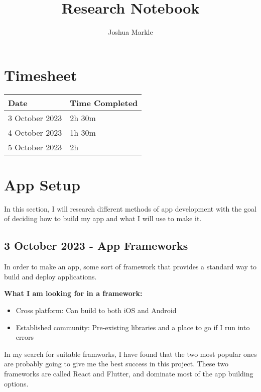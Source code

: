 \documentclass{article}
\title{Research Notebook}
\author{Joshua Markle}
\date{}
\begin{document}
\maketitle

\tableofcontents
\newpage

\section{Timesheet}

\begin{tabular}{|p{3cm}|p{3cm}|}
	\hline
	\textbf{Date} & \textbf{Time Completed} \\ \hline
	3 October 2023 & 2h 30m \\ \hline
	4 October 2023 & 1h 30m \\ \hline
	5 October 2023 & 2h \\ \hline
\end{tabular}
\newpage



\section{App Setup}

In this section, I will research different methods of app development with the goal of deciding how to build my app and what I will use to make it.

\subsection{3 October 2023 - App Frameworks}

In order to make an app, some sort of framework that provides a standard way to build and deploy applications.

\textbf{What I am looking for in a framework:}

\begin{itemize}
				\item Cross platform: Can build to both iOS and Android
				\item Established community: Pre-existing libraries and a place to go if I run into errors
\end{itemize}

In my search for suitable framworks, I have found that the two most popular ones are probably going to give me the best success in this project. These two frameworks are called React and Flutter, and dominate most of the app building options.
\end{document}

